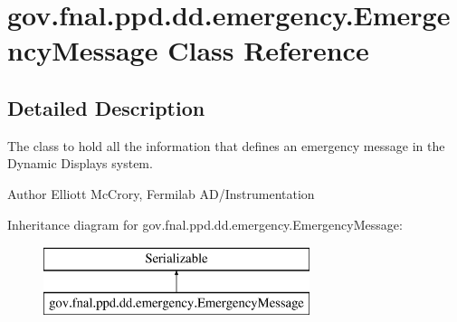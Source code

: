 \hypertarget{classgov_1_1fnal_1_1ppd_1_1dd_1_1emergency_1_1EmergencyMessage}{\section{gov.\-fnal.\-ppd.\-dd.\-emergency.\-Emergency\-Message Class Reference}
\label{classgov_1_1fnal_1_1ppd_1_1dd_1_1emergency_1_1EmergencyMessage}
}


\subsection{Detailed Description}
The class to hold all the information that defines an emergency message in the Dynamic Displays system.

\begin{DoxyAuthor}{Author}
Elliott Mc\-Crory, Fermilab A\-D/\-Instrumentation 
\end{DoxyAuthor}
Inheritance diagram for gov.\-fnal.\-ppd.\-dd.\-emergency.\-Emergency\-Message\-:\begin{figure}[H]
\begin{center}
\leavevmode
\includegraphics[height=2.000000cm]{classgov_1_1fnal_1_1ppd_1_1dd_1_1emergency_1_1EmergencyMessage}
\end{center}
\end{figure}
